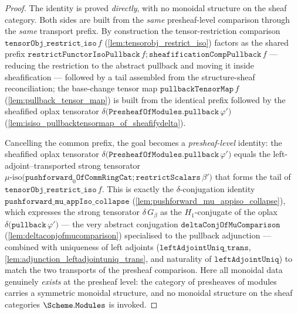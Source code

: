 \begin{proof}
  \leanok
  The identity is proved \emph{directly}, with no monoidal structure on the sheaf category. Both
  sides are built from the \emph{same} presheaf-level comparison through the \emph{same} transport
  prefix. By construction the tensor-restriction comparison
  \(\mathtt{tensorObj\_restrict\_iso}\,f\) (\cref{lem:tensorobj_restrict_iso}) factors as the shared
  prefix \(\mathtt{restrictFunctorIsoPullback}\,f \mathbin{;} \mathtt{sheafificationCompPullback}\,f\)
  --- reducing the restriction to the abstract pullback and moving it inside sheafification ---
  followed by a tail assembled from the structure-sheaf reconciliation; the base-change tensor map
  \(\mathtt{pullbackTensorMap}\,f\) (\cref{lem:pullback_tensor_map}) is built from the identical
  prefix followed by the sheafified oplax tensorator
  \(\delta\bigl(\mathtt{PresheafOfModules.pullback}\,\varphi'\bigr)\)
  (\cref{lem:isiso_pullbacktensormap_of_sheafifydelta}).

  Cancelling the common prefix, the goal becomes a \emph{presheaf-level} identity: the sheafified
  oplax tensorator \(\delta\bigl(\mathtt{PresheafOfModules.pullback}\,\varphi'\bigr)\) equals the
  left-adjoint--transported strong tensorator
  \(\mu\text{-iso}\bigl(\mathtt{pushforward}_0\mathtt{OfCommRingCat} \mathbin{;} \mathtt{restrictScalars}\,
  \beta'\bigr)\) that forms the tail of \(\mathtt{tensorObj\_restrict\_iso}\,f\). This is exactly the
  \(\delta\)-conjugation identity \(\mathtt{pushforward\_mu\_appIso\_collapse}\)
  (\cref{lem:pushforward_mu_appiso_collapse}), which expresses the strong tensorator
  \(\delta\,G_\beta\) as the \(H_1\)-conjugate of the oplax
  \(\delta\bigl(\mathtt{pullback}\,\varphi'\bigr)\) --- the very abstract conjugation
  \(\mathtt{deltaConjOfMuComparison}\) (\cref{lem:deltaconjofmucomparison}) specialised to the
  pullback adjunction --- combined with uniqueness of left adjoints
  (\(\mathtt{leftAdjointUniq\_trans}\), \cref{lem:adjunction_leftadjointuniq_trans}, and naturality of
  \(\mathtt{leftAdjointUniq}\)) to match the two transports of the presheaf comparison. Here all
  monoidal data genuinely \emph{exists} at the presheaf level: the category of presheaves of
  modules carries a symmetric monoidal structure, and no monoidal structure on the sheaf
  categories \(\Scheme.\mathtt{Modules}\) is invoked.


\end{proof}
